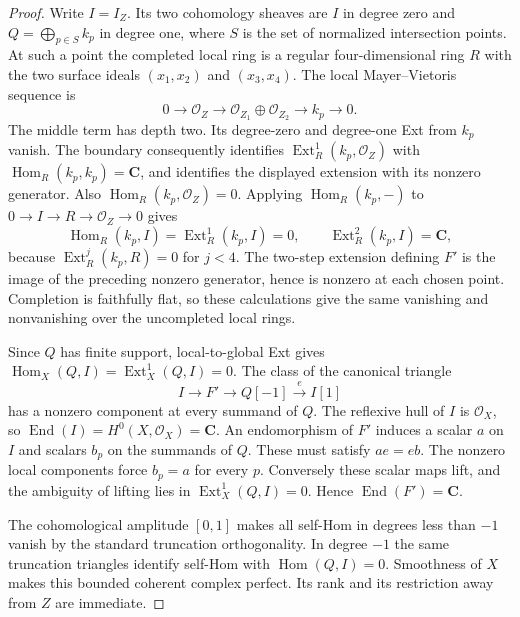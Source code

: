 \documentclass[11pt]{article}
\theoremstyle{definition}
\theoremstyle{remark}
\newcommand{\C}{\mathbf C}
\begin{document}
\begin{proof}
Write $I=I_Z$.  Its two cohomology sheaves are $I$ in degree zero
and $Q=\bigoplus_{p\in S}k_p$ in degree one, where $S$ is the set
of normalized intersection points.  At such a point the completed
local ring is a regular four-dimensional ring $R$ with the two
surface ideals $(x_1,x_2)$ and $(x_3,x_4)$.  The local
Mayer--Vietoris sequence is
\[
 0\to\mathcal O_Z\to\mathcal O_{Z_1}\oplus\mathcal O_{Z_2}
                                      \to k_p\to0.
\]
The middle term has depth two.  Its degree-zero and degree-one
Ext from $k_p$ vanish.  The boundary consequently identifies
$\operatorname{Ext}^1_R(k_p,\mathcal O_Z)$ with
$\operatorname{Hom}_R(k_p,k_p)=\C$, and identifies the displayed
extension with its nonzero generator.  Also
$\operatorname{Hom}_R(k_p,\mathcal O_Z)=0$.
Applying $\operatorname{Hom}_R(k_p,-)$ to
$0\to I\to R\to\mathcal O_Z\to0$ gives
\[
 \operatorname{Hom}_R(k_p,I)=
 \operatorname{Ext}^1_R(k_p,I)=0,
 \qquad \operatorname{Ext}^2_R(k_p,I)=\C,
\]
because $\operatorname{Ext}^j_R(k_p,R)=0$ for $j<4$.
The two-step extension defining $F'$ is the image of the preceding
nonzero generator, hence is nonzero at each chosen point.
Completion is faithfully flat, so these calculations give the same
vanishing and nonvanishing over the uncompleted local rings.

Since $Q$ has finite support, local-to-global Ext gives
$\operatorname{Hom}_X(Q,I)=\operatorname{Ext}^1_X(Q,I)=0$.
The class of the canonical triangle
\[
             I\longrightarrow F'\longrightarrow Q[-1]
                                      \xrightarrow{e}I[1]
\]
has a nonzero component at every summand of $Q$.
The reflexive hull of $I$ is $\mathcal O_X$, so
$\operatorname{End}(I)=H^0(X,\mathcal O_X)=\C$.
An endomorphism of $F'$ induces a scalar $a$ on $I$ and scalars
$b_p$ on the summands of $Q$.  These must satisfy $ae=eb$.
The nonzero local components force $b_p=a$ for every $p$.
Conversely these scalar maps lift, and the ambiguity of lifting
lies in $\operatorname{Ext}^1_X(Q,I)=0$.  Hence
$\operatorname{End}(F')=\C$.

The cohomological amplitude $[0,1]$ makes all self-Hom in degrees
less than $-1$ vanish by the standard truncation orthogonality.
In degree $-1$ the same truncation triangles identify self-Hom
with $\operatorname{Hom}(Q,I)=0$.  Smoothness of $X$ makes this
bounded coherent complex perfect.  Its rank and its restriction
away from $Z$ are immediate.
\end{proof}
\end{document}
